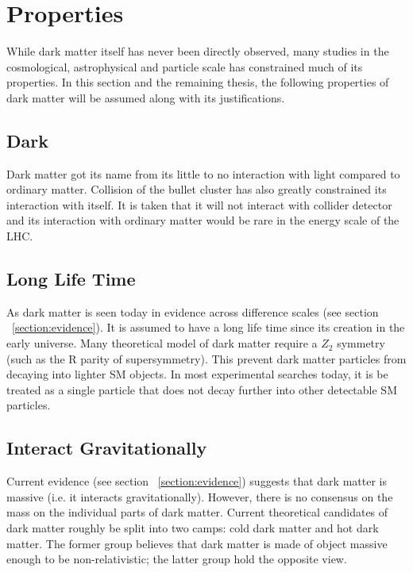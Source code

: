 

\section{Properties}
\label{section:properties}
While dark matter itself has never been directly observed, many studies in the cosmological, astrophysical and particle scale has constrained much of its properties. In this section and the remaining thesis, the following properties of dark matter will be assumed along with its justifications.

\subsection{Dark}

Dark matter got its name from its little to no interaction with light compared to ordinary matter. Collision of the bullet cluster has also greatly constrained its interaction with itself.  
It is taken that it will not interact with collider detector and its interaction with ordinary matter would be rare in the energy scale of the LHC. 

\subsection{Long Life Time}

As dark matter is seen today in evidence across difference scales (see section ~\ref{section:evidence}). It is assumed to have a long life time since its creation in the early universe. Many theoretical model of dark matter require a $Z_{2}$ symmetry (such as the R parity of supersymmetry). This prevent dark matter particles from decaying into lighter SM objects. In most experimental searches today, it is be treated as a single particle that does not decay further into other detectable SM particles. ~\cite{boveia2018dark}


\subsection{Interact Gravitationally}
Current evidence (see section ~\ref{section:evidence}) suggests that dark matter is massive (i.e. it interacts gravitationally). However, there is no consensus on the mass on the individual parts of dark matter. Current theoretical candidates of dark matter roughly be split into two camps: cold dark matter and hot dark matter. The former group believes that dark matter is made of object massive enough to be non-relativistic; the latter group hold the opposite view. 

